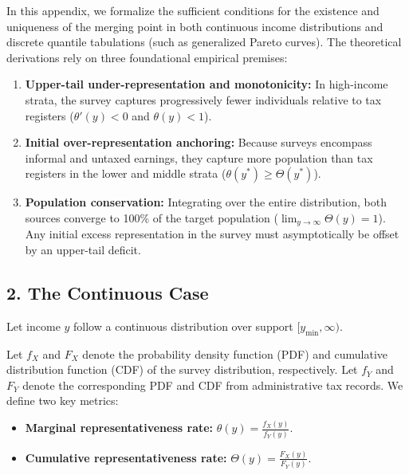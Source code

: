 In this appendix, we formalize the sufficient conditions for the existence and uniqueness of the merging point in both continuous income distributions and discrete quantile tabulations (such as generalized Pareto curves). The theoretical derivations rely on three foundational empirical premises:
\begin{enumerate}
    \item \textbf{Upper-tail under-representation and monotonicity:} In high-income strata, the survey captures progressively fewer individuals relative to tax registers ($\theta'(y) < 0$ and $\theta(y) < 1$).
    \item \textbf{Initial over-representation anchoring:} Because surveys encompass informal and untaxed earnings, they capture more population than tax registers in the lower and middle strata ($\theta(y^*) \ge \Theta(y^*)$).
    \item \textbf{Population conservation:} Integrating over the entire distribution, both sources converge to 100\% of the target population ($\lim_{y \to \infty} \Theta(y) = 1$). Any initial excess representation in the survey must asymptotically be offset by an upper-tail deficit.
\end{enumerate}

\subsection*{2. The Continuous Case}

Let income $y$ follow a continuous distribution over support $[y_{\min}, \infty)$.

\begin{definition}
Let $f_X$ and $F_X$ denote the probability density function (PDF) and cumulative distribution function (CDF) of the survey distribution, respectively. Let $f_Y$ and $F_Y$ denote the corresponding PDF and CDF from administrative tax records. We define two key metrics:
\begin{itemize}
    \item \textbf{Marginal representativeness rate:} $\theta(y) = \frac{f_X(y)}{f_Y(y)}$.
    \item \textbf{Cumulative representativeness rate:} $\Theta(y) = \frac{F_X(y)}{F_Y(y)}$.
\end{itemize}
\end{definition}

